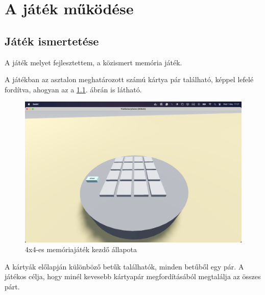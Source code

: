\chapter{A játék működése}

\thispagestyle{fancy}
\pagestyle{fancy}
\section{Játék ismertetése}

A játék melyet fejlesztettem, a közismert memória játék.

A játékban az asztalon meghatározott számú kártya pár található, képpel lefelé fordítva, ahogyan az a \ref{img:asztal}. ábrán is látható.
\begin{figure}[h]
    \includegraphics[width=\textwidth]{img/asztal_4x4.png}
    \caption{4x4-es memóriajáték kezdő állapota}
    \label{img:asztal}
\end{figure}
A kártyák előlapján különböző betűk találhatók, minden betűből egy pár. A játékos célja, hogy minél kevesebb kártyapár megfordításából megtalálja az összes párt.


